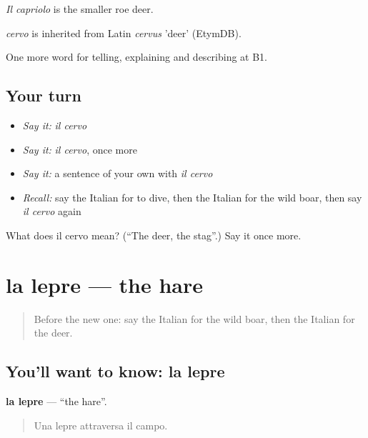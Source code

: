 \emph{Il capriolo} is the smaller roe deer.

\begin{cousinweb}
\emph{cervo} is inherited from Latin \emph{cervus} 'deer' (EtymDB).
\end{cousinweb}

\begin{grammarlens}[title={What you've built}]
One more word for telling, explaining and describing at B1.
\end{grammarlens}

\subsection*{Your turn}
\begin{itemize}
\raggedright
  \item \emph{Say it:} \emph{il cervo}
  \item \emph{Say it:} \emph{il cervo}, once more
  \item \emph{Say it:} a sentence of your own with \emph{il cervo}
  \item \emph{Recall:} say the Italian for to dive, then the Italian for the wild boar, then say \emph{il cervo} again
\end{itemize}

\begin{tcolorbox}[breakable,colback=teal!4,colframe=teal!35!black,title={Before you move on}]
What does il cervo mean? (\textquotedblleft{}The deer, the stag\textquotedblright{}.) Say it once more.
\end{tcolorbox}
\section[la lepre]{la lepre — the hare}

\label{lesson:IT-C464-lepre}



\begin{quote}
Before the new one: say the Italian for the wild boar, then the Italian for the deer.
\end{quote}

\subsection*{You'll want to know: la lepre}
\textbf{la lepre} — \textquotedblleft{}the hare\textquotedblright{}.

\begin{quote}
Una lepre attraversa il campo.
\end{quote}

